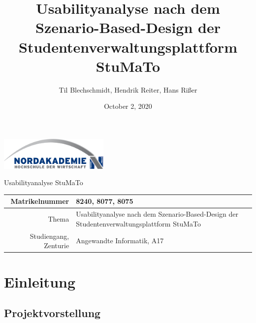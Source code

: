 \documentclass[
  12pt,
  ngerman,
  a4paper,
]{article}
\title{Usabilityanalyse nach dem Szenario-Based-Design der
Studentenverwaltungsplattform StuMaTo}
\author{Til Blechschmidt, Hendrik Reiter, Hans Rißer}
\date{October 2, 2020}
\begin{document}
\begin{center}
  \includegraphics[width=0.4\textwidth,keepaspectratio]{.template/logo}
  \vspace{2cm}
\end{center}

\begin{center}
  {\huge Usabilityanalyse StuMaTo}
  \vspace{1cm}
\end{center}

\begin{center}
  \begin{tabularx}{\textwidth}{r|X}
    Matrikelnummer & 8240, 8077, 8075 \\\midrule
    Thema & Usabilityanalyse nach dem Szenario-Based-Design der
Studentenverwaltungsplattform StuMaTo \\\midrule
    Studiengang, Zenturie & Angewandte Informatik, A17\
  \end{tabularx}
\end{center}


\pagebreak

\pagestyle{fancy}
\cfoot{\thepage}

\linespread{1.5}
\setcounter{tocdepth}{2}
\setcounter{secnumdepth}{3}


{
\setcounter{tocdepth}{3}
\tableofcontents
}
\pagebreak
\pagebreak
{}
\renewcommand{\arraystretch}{1.5}

\hypertarget{einleitung}{%
\section{Einleitung}\label{einleitung}}

\hypertarget{projektvorstellung}{%
\subsection{Projektvorstellung}\label{projektvorstellung}}
\end{document}
